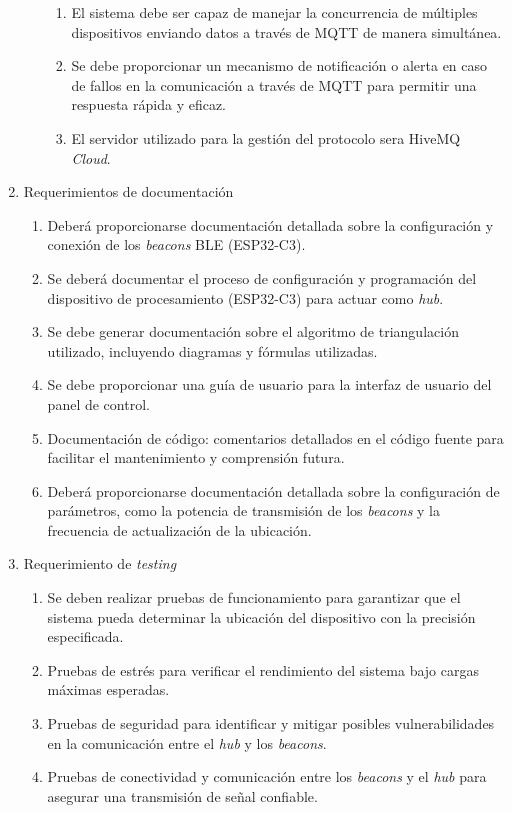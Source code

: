 \documentclass[
11pt, %
]{charter}
\begin{document}
\begin{enumerate}
\begin{enumerate}
\begin{enumerate}
					\item El sistema debe ser capaz de manejar la concurrencia de múltiples dispositivos enviando datos a través de MQTT de manera simultánea.
					\item Se debe proporcionar un mecanismo de notificación o alerta en caso de fallos en la comunicación a través de MQTT para permitir una respuesta rápida y eficaz.
					\item El servidor utilizado para la gestión del protocolo sera HiveMQ \textit{Cloud}.
				\end{enumerate}
		\end{enumerate}
	\item Requerimientos de documentación
		\begin{enumerate}
			\item Deberá proporcionarse documentación detallada sobre la configuración y conexión de los \textit{beacons} BLE (ESP32-C3).
			\item Se deberá documentar el proceso de configuración y programación del dispositivo de procesamiento (ESP32-C3) para actuar como \textit{hub}.
			\item Se debe generar documentación sobre el algoritmo de triangulación utilizado, incluyendo diagramas y fórmulas utilizadas.
			\item Se debe proporcionar una guía de usuario para la interfaz de usuario del panel de control.
			\item Documentación de código: comentarios detallados en el código fuente para facilitar el mantenimiento y comprensión futura.
			\item Deberá proporcionarse documentación detallada sobre la configuración de parámetros, como la potencia de transmisión de los \textit{beacons} y la frecuencia de actualización de la ubicación.
		\end{enumerate}
	\item Requerimiento de \textit{testing}
		\begin{enumerate}
			\item Se deben realizar pruebas de funcionamiento para garantizar que el sistema pueda determinar la ubicación del dispositivo con la precisión especificada.
			\item Pruebas de estrés para verificar el rendimiento del sistema bajo cargas máximas esperadas.
			\item Pruebas de seguridad para identificar y mitigar posibles vulnerabilidades en la comunicación entre el \textit{hub} y los \textit{beacons}.
			\item Pruebas de conectividad y comunicación entre los \textit{beacons} y el \textit{hub} para asegurar una transmisión de señal confiable.

\end{enumerate}
\end{enumerate}
\end{document}
